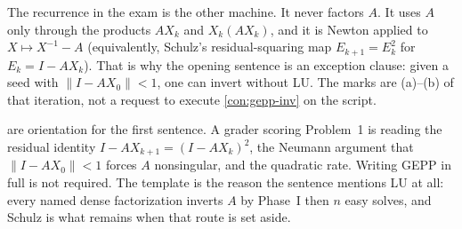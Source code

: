 The recurrence in the exam is the other machine. It never factors \(A\). It uses \(A\) only through the products \(AX_{k}\) and \(X_{k}(AX_{k})\), and it is Newton applied to \(X\mapsto X^{-1}-A\) (equivalently, Schulz's residual-squaring map \(E_{k+1}=E_{k}^{2}\) for \(E_{k}=I-AX_{k}\)). That is why the opening sentence is an exception clause: given a seed with \(\|I-AX_{0}\|<1\), one can invert without LU. The marks are (a)--(b) of that iteration, not a request to execute \cref{con:gepp-inv} on the script.

\begin{examnote}
\label{examnote:p1-lu}
 are orientation for the first sentence. A grader scoring Problem~1 is reading the residual identity \(I-AX_{k+1}=(I-AX_{k})^{2}\), the Neumann argument that \(\|I-AX_{0}\|<1\) forces \(A\) nonsingular, and the quadratic rate. Writing GEPP in full is not required. The template is the reason the sentence mentions LU at all: every named dense factorization inverts \(A\) by Phase~I then \(n\) easy solves, and Schulz is what remains when that route is set aside.
\end{examnote}

